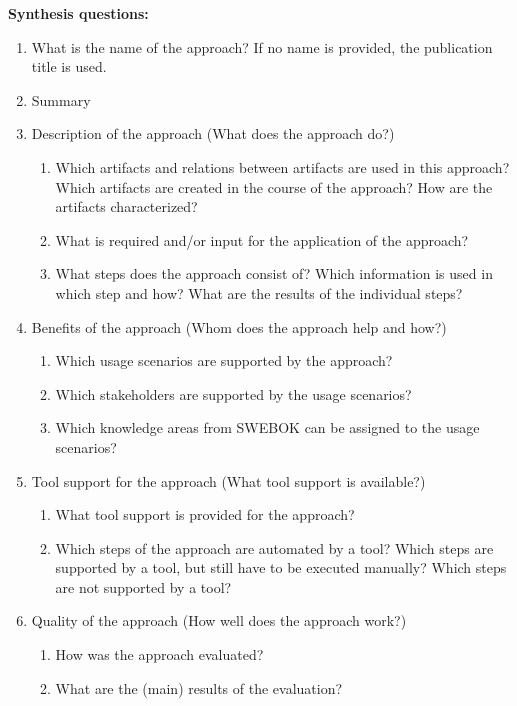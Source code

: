 \textbf{Synthesis questions:}

\begin{enumerate}
	\item What is the name of the approach? If no name is provided, the publication title is used.
	\item Summary
	\item Description of the approach (What does the approach do?)
	\begin{enumerate}
		\item Which artifacts and relations between artifacts are used in this approach? Which artifacts are created in the course of the approach? How are the artifacts characterized?
		\item What is required and/or input for the application of the approach?
		\item What steps does the approach consist of? Which information is used in which step and how? What are the results of the individual steps?
	\end{enumerate}
	\item Benefits of the approach (Whom does the approach help and how?)
	\begin{enumerate}
		\item Which usage scenarios are supported by the approach?
		\item Which stakeholders are supported by the usage scenarios?
		\item Which knowledge areas from SWEBOK can be assigned to the usage scenarios?
	\end{enumerate}
	\item Tool support for the approach (What tool support is available?)
	\begin{enumerate}
		\item What tool support is provided for the approach?
		\item Which steps of the approach are automated by a tool? Which steps are supported by a tool, but still have to be executed manually? Which steps are not supported by a tool?
	\end{enumerate}
	\item Quality of the approach (How well does the approach work?)
	\begin{enumerate}
		\item How was the approach evaluated?
		\item What are the (main) results of the evaluation?
	\end{enumerate}
\end{enumerate}

